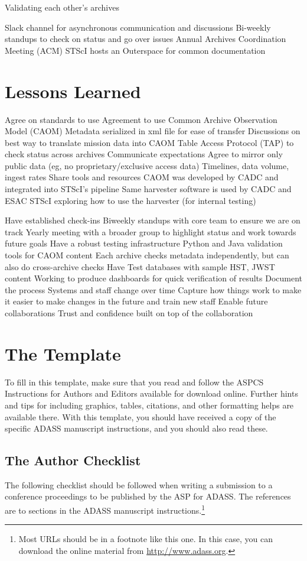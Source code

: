 \documentclass[11pt,twoside]{article}
\begin{document}
Validating each other’s archives

Slack channel for asynchronous communication and discussions
Bi-weekly standups to check on status and go over issues
Annual Archives Coordination Meeting (ACM)
STScI hosts an Outerspace for common documentation

\section{Lessons Learned}

Agree on standards to use
Agreement to use Common Archive Observation Model (CAOM)
Metadata serialized in xml file for ease of transfer
Discussions on best way to translate mission data into CAOM
Table Access Protocol (TAP) to check status across archives
Communicate expectations
Agree to mirror only public data (eg, no proprietary/exclusive access data)
Timelines, data volume, ingest rates
Share tools and resources
CAOM was developed by CADC and integrated into STScI’s pipeline
Same harvester software is used by CADC and ESAC
STScI exploring how to use the harvester (for internal testing)

Have established check-ins
Biweekly standups with core team to ensure we are on track
Yearly meeting with a broader group to highlight status and work towards future goals
Have a robust testing infrastructure
Python and Java validation tools for CAOM content
Each archive checks metadata independently, but can also do cross-archive checks
Have Test databases with sample HST, JWST content
Working to produce dashboards for quick verification of results
Document the process
Systems and staff change over time
Capture how things work to make it easier to make changes in the future and train new staff
Enable future collaborations
Trust and confidence built on top of the collaboration


\section{The Template}
To fill in this template, make sure that you read and follow the ASPCS Instructions for Authors and Editors available for download online. Further hints and tips for including graphics, tables, citations, and other formatting helps are available there. With this template, you should have received a copy of the specific ADASS manuscript instructions, and you should also read these.

\subsection{The Author Checklist}
The following checklist should be followed when writing a submission to a conference proceedings to be published by the ASP for ADASS. The references are to sections in the ADASS manuscript instructions.\footnote{Most URLs should be in a footnote like this one.  In this case, you can download the online material from \url{http://www.adass.org}.} 
\end{document}

